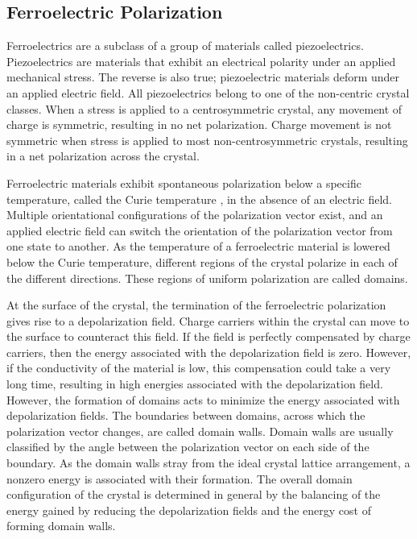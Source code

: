 \subsection{Ferroelectric Polarization}
\label{subsec:background.ferroelectric}


Ferroelectrics are a subclass of a group of materials called piezoelectrics.
Piezoelectrics are materials that exhibit an electrical polarity under an applied
mechanical stress. The reverse is also true; piezoelectric materials deform under an
applied electric field. \cite{Lines:1977ug} All piezoelectrics belong to one of the
non-centric crystal classes. When a stress is applied to a centrosymmetric crystal, any
movement of charge is symmetric, resulting in no net polarization. Charge movement is not
symmetric when stress is applied to most non-centrosymmetric crystals, resulting in a net
polarization across the crystal. \cite{Lines:1977ug}

Ferroelectric materials exhibit spontaneous polarization below a specific temperature,
called the Curie temperature , in the absence of an electric field.
\cite{Lines:1977ug} Multiple orientational configurations of the polarization vector
exist, and an applied electric field can switch the orientation of the polarization vector
from one state to another.\cite{Lines:1977ug,Anonymous:7uC1r_sG} As the temperature of a
ferroelectric material is lowered below the Curie temperature, different regions of the
crystal polarize in each of the different directions. These regions of uniform
polarization are called domains.\cite{Lines:1977ug,Anonymous:7uC1r_sG,ForsberghJr:1949vl}

At the surface of the crystal, the termination of the ferroelectric polarization gives
rise to a depolarization field. Charge carriers within the crystal can move to the surface
to counteract this field. If the field is perfectly compensated by charge carriers, then
the energy associated with the depolarization field is zero. However, if the conductivity
of the material is low, this compensation could take a very long time, resulting in high
energies associated with the depolarization field. However, the formation of domains acts
to minimize the energy associated with depolarization fields. The boundaries between
domains, across which the polarization vector changes, are called domain walls. Domain
walls are usually classified by the angle between the polarization vector on each side of
the boundary. As the domain walls stray from the ideal crystal lattice arrangement, a
nonzero energy is associated with their formation. The overall domain configuration of the
crystal is determined in general by the balancing of the energy gained by reducing the
depolarization fields and the energy cost of forming domain walls.

